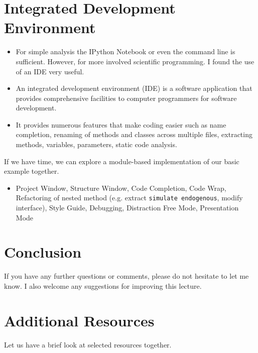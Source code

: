 \section{Integrated Development Environment}
\begin{itemize}
\item For simple analysis the IPython Notebook or even the command line is sufficient. However, for more involved scientific programming. I found the use of an IDE very useful.
\item An integrated development environment (IDE) is a software application that provides comprehensive facilities to computer programmers for software development.
\item It provides numerous features that make coding easier such as name completion, renaming of methods and classes across multiple files, extracting methods, variables, parameters, static code analysis.
\end{itemize}

If we have time, we can explore a module-based implementation of our basic example together.
\begin{itemize}
\item Project Window, Structure Window, Code Completion, Code Wrap, Refactoring of nested method (e.g. extract \verb+simulate endogenous+, modify interface), Style Guide, Debugging, Distraction Free Mode, Presentation Mode
\end{itemize}

\section{Conclusion}
If you have any further questions or comments, please do not hesitate to let me know. I also welcome any suggestions for improving this lecture.

\section{Additional Resources}
Let us have a brief look at selected resources together.





